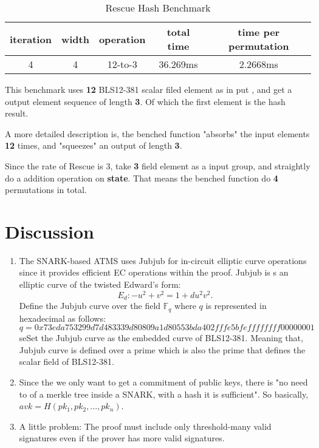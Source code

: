 \documentclass{article}
\begin{document}
\begin{table}[H]
    \centering
    \begin{tabular}{c|c|c|c|c} \hline
         iteration& width & operation & total time & time per permutation \\ \hline
         4& 4& 12-to-3 &36.269ms & 2.2668ms \\ \hline
    \end{tabular}
    \caption{Rescue Hash Benchmark}
    \label{tab:my_label}
\end{table}


This benchmark uses \textbf{12} BLS12-381 scalar filed element as in put , and get a output element sequence of length \textbf{3}. Of which the first element is the hash result.

A more detailed description is, the benched function "absorbs" the input elements \textbf{12} times, and "squeezes" an output of length \textbf{3}.

Since the rate of Rescue is 3, take \textbf{3} field element as a input group, and straightly do a addition operation on \textbf{state}. That means the benched function do \textbf{4} permutations in total.

\section{Discussion}

\begin{enumerate}
    \item The SNARK-based ATMS uses Jubjub for in-circuit elliptic curve operations since it provides efficient EC operations within the proof. Jubjub is s an elliptic curve of the twisted Edward's form:
    $$E_{d}: -u^2 + v^2 = 1 + du^2v^2.$$
    Define the Jubjub curve over the field $\mathbb{F}_q$ where $q$ is represented in hexadecimal as follows:
    $$q = 0x73eda753299d7d483339d80809a1d80553bda402fffe5bfeffffffff00000001$$seSet the Jubjub curve as the embedded curve of BLS12-381.
    Meaning that, Jubjub curve is defined over a prime which is also the prime that defines the scalar field of BLS12-381.


    \item Since the we only want to get a commitment of public keys, there is "no need to of a merkle tree inside a SNARK, with a hash it is sufficient". So basically, $avk = H(pk_1, pk_2, ..., pk_n)$.

    \item A little problem: The proof must include only threshold-many valid signatures even if the prover has more valid signatures.

\end{enumerate}
\end{document}
